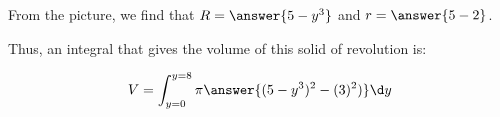 \documentclass{ximera}
\begin{document}
\begin{exercise}
\begin{exercise}
\begin{exercise}
From the picture, we find that $R = \answer{5-y^3}$ and $r= \answer{5-2 }$.

\begin{exercise}
Thus, an integral that gives the volume of this solid of revolution is:

\[
V = \int_{y=0}^{y=8} \pi \answer{(5-y^3)^2-(3)^2)} \d y
\]
\end{exercise}


\end{exercise}
\end{exercise}












\end{exercise}
\end{document}
